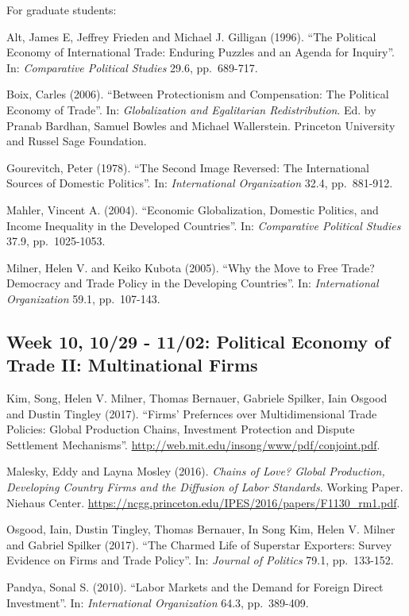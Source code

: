 \documentclass[11pt,]{article}
\begin{document}
For graduate students:

Alt, James E, Jeffrey Frieden and Michael J. Gilligan (1996). ``The
Political Economy of International Trade: Enduring Puzzles and an Agenda
for Inquiry''. In: \emph{Comparative Political Studies} 29.6,
pp.~689-717.

Boix, Carles (2006). ``Between Protectionism and Compensation: The
Political Economy of Trade''. In:
\emph{Globalization and Egalitarian Redistribution}. Ed. by Pranab
Bardhan, Samuel Bowles and Michael Wallerstein. Princeton University and
Russel Sage Foundation.

Gourevitch, Peter (1978). ``The Second Image Reversed: The International
Sources of Domestic Politics''. In: \emph{International Organization}
32.4, pp.~881-912.

Mahler, Vincent A. (2004). ``Economic Globalization, Domestic Politics,
and Income Inequality in the Developed Countries''. In:
\emph{Comparative Political Studies} 37.9, pp.~1025-1053.

Milner, Helen V. and Keiko Kubota (2005). ``Why the Move to Free Trade?
Democracy and Trade Policy in the Developing Countries''. In:
\emph{International Organization} 59.1, pp.~107-143.

\subsection{Week 10, 10/29 - 11/02: Political Economy of Trade II:
Multinational
Firms}\label{week-10-1029---1102-political-economy-of-trade-ii-multinational-firms}

Kim, Song, Helen V. Milner, Thomas Bernauer, Gabriele Spilker, Iain
Osgood and Dustin Tingley (2017). ``Firms' Prefernces over
Multidimensional Trade Policies: Global Production Chains, Investment
Protection and Dispute Settlement Mechanisms''.
\url{http://web.mit.edu/insong/www/pdf/conjoint.pdf}.

Malesky, Eddy and Layna Mosley (2016).
\emph{Chains of Love? Global Production, Developing Country Firms and the Diffusion of Labor Standards}.
Working Paper. Niehaus Center.
\url{https://ncgg.princeton.edu/IPES/2016/papers/F1130_rm1.pdf}.

Osgood, Iain, Dustin Tingley, Thomas Bernauer, In Song Kim, Helen V.
Milner and Gabriel Spilker (2017). ``The Charmed Life of Superstar
Exporters: Survey Evidence on Firms and Trade Policy''. In:
\emph{Journal of Politics} 79.1, pp.~133-152.

Pandya, Sonal S. (2010). ``Labor Markets and the Demand for Foreign
Direct Investment''. In: \emph{International Organization} 64.3,
pp.~389-409.
\end{document}
